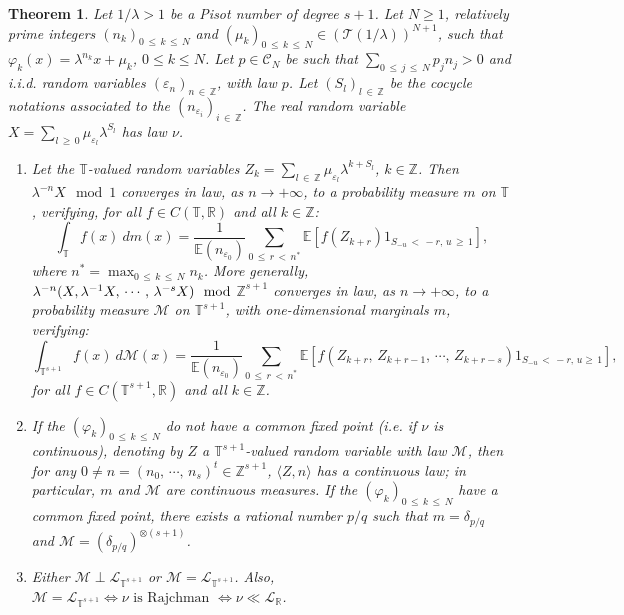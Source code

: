 \documentclass[10pt]{amsart}
\newtheorem{theo}{Theorem}[section]
\theoremstyle{definition}\newtheorem{defi}[theo]{Definition}\newtheorem{rema}[theo]{Remark}\newtheorem{exam}[theo]{Example}\newtheorem{exem}[theo]{Example}\newtheorem{nota}[theo]{Notation}
\newcommand{\Ebb}{\mathbb E}
\newcommand{\Tbb}{\mathbb T}
\newcommand{\Rbb}{\mathbb R}
\newcommand{\Zbb}{\mathbb Z}
\newcommand{\Lcl}{\mathcal{L}}
\newcommand{\Ccl}{\mathcal{C}}
\newcommand{\Tcl}{\mathcal{T}}
\newcommand{\Mcl}{\mathcal{M}}
\newcommand*{\romanenumi}{\renewcommand*{\theenumi}{\roman{enumi}}}
\begin{document}
\begin{theo}\label{part2}
Let $1/\lambda>1$ be a Pisot number of degree $s+1$. Let $N\geq 1$, relatively prime integers $(n_k)_{0\,\leq\,k\,\leq\,N}$ and $(\mu_k)_{0\,\leq\,k\,\leq\,N}\in ({\Tcl}(1/\lambda))^{N+1}$, such that $\varphi_k(x)=\lambda^{n_k}x+\mu_k$, $0\leq k\leq N$. Let $p\in{\Ccl}_N$ be such that $\sum_{0\,\leq\,j\,\leq\,N}p_jn_j>0$ and i.i.d. random variables $(\varepsilon_n)_{n\,\in\,\Zbb}$, with law $p$. Let $(S_l)_{l\,\in\,\Zbb}$ be the cocycle notations associated to the $(n_{\varepsilon_i})_{i\,\in\,\Zbb}$. The real random variable $X=\sum_{l\,\geq\,0}\mu_{\varepsilon_l}\lambda^{S_l}$ has law $\nu$.


\begin{enumerate}\romanenumi
\item \label{theo2.6.1}Let the $\Tbb$-valued random variables $Z_k=\sum_{l\,\in\,\Zbb}\mu_{\varepsilon_l}\lambda^{k+S_l}$, $k\in\Zbb$. Then $\lambda^{-n}X\mod 1$ converges in law, as $n\rightarrow+\infty$, to a probability measure $m$ on $\Tbb$, verifying, for all $f\in C(\Tbb,\Rbb)$ and all $k\in\Zbb$:
\[
\int_{\Tbb} f(x)~dm(x)=\frac{1}{\Ebb(n_{\varepsilon_0})}\sum_{0\,\leq\,r\,<\,n^*}\Ebb\left[{f\left({Z_{k+r}}\right)1_{S_{-u}\,<\,-r,\,u\,\geq\,1}}\right],
\]
where $n^*=\max_{0\,\leq\,k\,\leq\,N}n_k$. More generally, $\lambda^{-n}(X,\lambda^{-1}X,\,\cdots,\,\lambda^{-s}X)\mod$\linebreak$\Zbb^{s+1}$ converges in law, as $n\rightarrow+\infty$, to a probability measure $\Mcl$ on $\Tbb^{s+1}$, with one-dimensional marginals $m$, verifying:
\[
\int_{\Tbb^{s+1}} f(x)~d{\Mcl}(x)=\frac{1}{\Ebb(n_{\varepsilon_0})}\sum_{0\,\leq\,r\,<\,n^*}\Ebb\left[{f\left({Z_{k+r},\,Z_{k+r-1},\,\cdots,\,Z_{k+r-s}}\right)1_{S_{-u}\,<\,-r,\,u\geq\,1}}\right],
\]
for all $f\in C(\Tbb^{s+1},\Rbb)$ and all $k\in\Zbb$.


\item \label{theo2.6.2}If the $(\varphi_k)_{0\,\leq\,k\,\leq\,N}$ do not have a common fixed point (i.e. if $\nu$ is continuous), denoting by $Z$ a $\Tbb^{s+1}$-valued random variable with law $\Mcl$, then for any $0\not=n=(n_0,\,\cdots,\,n_s)^t\in\Zbb^{s+1}$, $\langle Z,n\rangle$ has a continuous law; in particular, $m$ and ${\Mcl}$ are continuous measures. If the $(\varphi_k)_{0\,\leq\,k\,\leq\,N}$ have a common fixed point, there exists a rational number $p/q$ such that $m=\delta_{p/q}$ and ${\Mcl}=(\delta_{p/q})^{\otimes (s+1)}$.


\item \label{theo2.6.3}Either ${\Mcl}\perp{\Lcl}_{\Tbb^{s+1}}$ or ${\Mcl}={\Lcl}_{\Tbb^{s+1}}$. Also, ${\Mcl}={\Lcl}_{\Tbb^{s+1}}\Leftrightarrow \nu\text{ is Rajchman }\Leftrightarrow\nu\ll{\Lcl}_{\Rbb}$.
\end{enumerate}
\end{theo}
\end{document}
